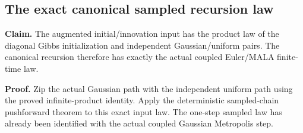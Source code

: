\documentclass[11pt,a4paper]{report}
\begin{document}
\subsection{\texorpdfstring{The exact canonical sampled recursion law}{The exact canonical sampled recursion law}}
\label{report-step-WassersteinMixing-SemigroupRandomMALACanonical-lean-2}


\textbf{Claim.} The augmented initial/\allowbreak{}innovation input has the product law of the diagonal Gibbs initialization and independent Gaussian/\allowbreak{}uniform pairs. The canonical recursion therefore has exactly the actual coupled Euler/\allowbreak{}MALA finite-time law.



\textbf{Proof.} Zip the actual Gaussian path with the independent uniform path using the proved infinite-product identity. Apply the deterministic sampled-chain pushforward theorem to this exact input law. The one-step sampled law has already been identified with the actual coupled Gaussian Metropolis step.
\end{document}
